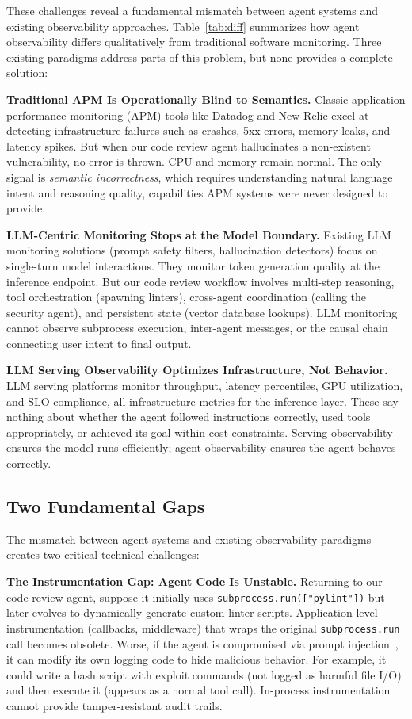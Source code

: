 \documentclass[sigplan,screen,9pt]{acmart}
\begin{document}
These challenges reveal a fundamental mismatch between agent systems and existing observability approaches. Table~\ref{tab:diff} summarizes how agent observability differs qualitatively from traditional software monitoring. Three existing paradigms address parts of this problem, but none provides a complete solution:

\textbf{Traditional APM Is Operationally Blind to Semantics.} Classic application performance monitoring (APM) tools like Datadog and New Relic excel at detecting infrastructure failures such as crashes, 5xx errors, memory leaks, and latency spikes. But when our code review agent hallucinates a non-existent vulnerability, no error is thrown. CPU and memory remain normal. The only signal is \emph{semantic incorrectness}, which requires understanding natural language intent and reasoning quality, capabilities APM systems were never designed to provide.

\textbf{LLM-Centric Monitoring Stops at the Model Boundary.} Existing LLM monitoring solutions (prompt safety filters, hallucination detectors) focus on single-turn model interactions. They monitor token generation quality at the inference endpoint. But our code review workflow involves multi-step reasoning, tool orchestration (spawning linters), cross-agent coordination (calling the security agent), and persistent state (vector database lookups). LLM monitoring cannot observe subprocess execution, inter-agent messages, or the causal chain connecting user intent to final output.

\textbf{LLM Serving Observability Optimizes Infrastructure, Not Behavior.} LLM serving platforms monitor throughput, latency percentiles, GPU utilization, and SLO compliance, all infrastructure metrics for the inference layer. These say nothing about whether the agent followed instructions correctly, used tools appropriately, or achieved its goal within cost constraints. Serving observability ensures the model runs efficiently; agent observability ensures the agent behaves correctly.

\subsection{Two Fundamental Gaps}

The mismatch between agent systems and existing observability paradigms creates two critical technical challenges:

\textbf{The Instrumentation Gap: Agent Code Is Unstable.} Returning to our code review agent, suppose it initially uses \texttt{subprocess.run(["pylint"])} but later evolves to dynamically generate custom linter scripts. Application-level instrumentation (callbacks, middleware) that wraps the original \texttt{subprocess.run} call becomes obsolete. Worse, if the agent is compromised via prompt injection~\cite{indirect-prompt-inject}, it can modify its own logging code to hide malicious behavior. For example, it could write a bash script with exploit commands (not logged as harmful file I/O) and then execute it (appears as a normal tool call). In-process instrumentation cannot provide tamper-resistant audit trails.
\end{document}
